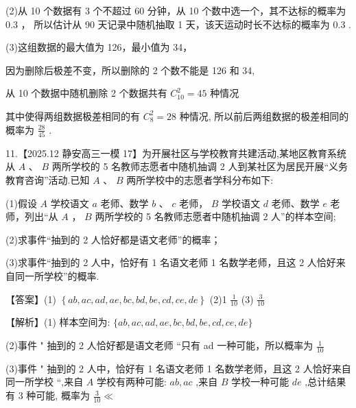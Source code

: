 \documentclass[10pt]{article}
\begin{document}
(2)从 10 个数据有 3 个不超过 60 分钟，从 10 个数中选一个，其不达标的概率为 0.3 ， 所以估计从 90 天记录中随机抽取 1 天，该天运动时长不达标的概率为 0.3 .

(3)这组数据的最大值为 126，最小值为 34，

因为删除后极差不变，所以删除的 2 个数不能是 126 和 34,

从 10 个数据中随机删除 2 个数据共有 \({C}_{10}^{2} = {45}\) 种情况

其中使得两组数据极差相同的有 \({C}_{8}^{2} = {28}\) 种情况, 所以前后两组数据的极差相同的概率为 \(\frac{28}{45}\) .

11.【2025.12 静安高三一模 17】为开展社区与学校教育共建活动,某地区教育系统从 \(A\text{ 、 }B\) 两所学校的 5 名教师志愿者中随机抽调 2 人到某社区为居民开展“义务教育咨询”活动.已知 \(A\text{ 、 }B\) 两所学校中的志愿者学科分布如下:

\begin{center}
\end{center}

(1)假设 \(A\) 学校语文 \(a\) 老师、数学 \(b\text{ 、 }c\) 老师， \(B\) 学校语文 \(d\) 老师、数学 \(e\) 老师，列出“从 \(A\) ， \(B\) 两所学校的 5 名教师志愿者中随机抽调 2 人”的样本空间;

(2)求事件“抽到的 2 人恰好都是语文老师”的概率；

(3)求事件“抽到的 2 人中，恰好有 1 名语文老师 1 名数学老师，且这 2 人恰好来自同一所学校”的概率.

【答案】(1) \(\left\{  {{ab},{ac},{ad},{ae},{bc},{bd},{be},{cd},{ce},{de}}\right\}\) (2)1 \(\frac{1}{10}\) (3) \(\frac{3}{10}\)

【解析】(1) 样本空间为: \(\{ {ab},{ac},{ad},{ae},{bc},{bd},{be},{cd},{ce},{de}\}\)

(2)事件 " 抽到的 2 人恰好都是语文老师 “只有 ad 一种可能，所以概率为 \(\frac{1}{10}\)

(3)事件 " 抽到的 2 人中，恰好有 1 名语文老师 1 名数学老师，且这 2 人恰好来自同一所学校 “,来自 \(A\) 学校有两种可能: \({ab},{ac}\) ,来自 \(B\) 学校一种可能 \({de}\) ,总计结果有 3 种可能, 概率为 \(\frac{3}{10} \ll\)
\end{document}
